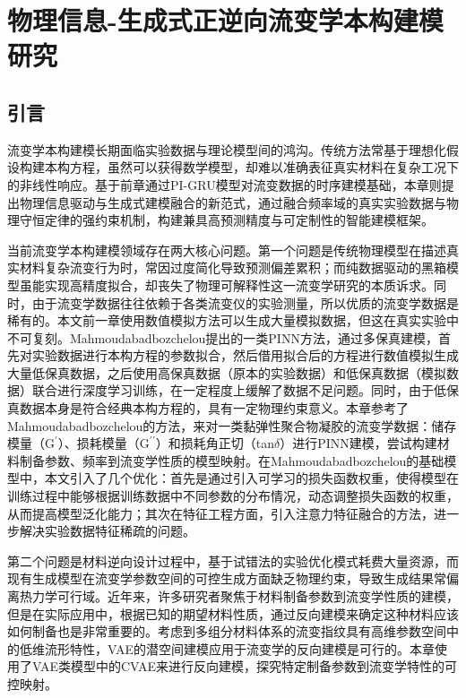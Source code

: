 \chapter{物理信息-生成式正逆向流变学本构建模研究}
\section{引言}
流变学本构建模长期面临实验数据与理论模型间的鸿沟。传统方法常基于理想化假设构建本构方程，虽然可以获得数学模型，却难以准确表征真实材料在复杂工况下的非线性响应。基于前章通过PI-GRU模型对流变数据的时序建模基础，本章则提出物理信息驱动与生成式建模融合的新范式，通过融合频率域的真实实验数据与物理守恒定律的强约束机制，构建兼具高预测精度与可定制性的智能建模框架。

当前流变学本构建模领域存在两大核心问题。第一个问题是传统物理模型在描述真实材料复杂流变行为时，常因过度简化导致预测偏差累积；而纯数据驱动的黑箱模型虽能实现高精度拟合，却丧失了物理可解释性这一流变学研究的本质诉求。同时，由于流变学数据往往依赖于各类流变仪的实验测量，所以优质的流变学数据是稀有的。本文前一章使用数值模拟方法可以生成大量模拟数据，但这在真实实验中不可复刻。Mahmoudabadbozchelou提出的一类PINN方法，通过多保真建模，首先对实验数据进行本构方程的参数拟合，然后借用拟合后的方程进行数值模拟生成大量低保真数据，之后使用高保真数据（原本的实验数据）和低保真数据（模拟数据）联合进行深度学习训练，在一定程度上缓解了数据不足问题。同时，由于低保真数据本身是符合经典本构方程的，具有一定物理约束意义。本章参考了Mahmoudabadbozchelou的方法，来对一类黏弹性聚合物凝胶的流变学数据：储存模量（$\mathrm{G^{\prime}}$）、损耗模量（$\mathrm{G^{\prime\prime}}$）和损耗角正切（tan$\delta$）进行PINN建模，尝试构建材料制备参数、频率到流变学性质的模型映射。在Mahmoudabadbozchelou的基础模型中，本文引入了几个优化：首先是通过引入可学习的损失函数权重，使得模型在训练过程中能够根据训练数据中不同参数的分布情况，动态调整损失函数的权重，从而提高模型泛化能力；其次在特征工程方面，引入注意力特征融合的方法，进一步解决实验数据特征稀疏的问题。

第二个问题是材料逆向设计过程中，基于试错法的实验优化模式耗费大量资源，而现有生成模型在流变学参数空间的可控生成方面缺乏物理约束，导致生成结果常偏离热力学可行域。近年来，许多研究者聚焦于材料制备参数到流变学性质的建模，但是在实际应用中，根据已知的期望材料性质，通过反向建模来确定这种材料应该如何制备也是非常重要的。考虑到多组分材料体系的流变指纹具有高维参数空间中的低维流形特性，VAE的潜空间建模应用于流变学的反向建模是可行的。本章使用了VAE类模型中的CVAE来进行反向建模，探究特定制备参数到流变学特性的可控映射。


